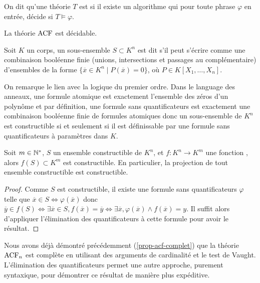 \begin{coro}
    On dit qu'une théorie $T$ est  si il existe un algorithme qui pour
    toute phrase $\varphi$ en entrée, décide si $T \models \varphi$.

    La théorie $\operatorname{ACF}$ est décidable.
\end{coro}

\begin{defi}\label{defi-constructible}
    Soit $K$ un corps, un sous-ensemble $S \subset K^n$ est dit
    s'il peut s'écrire comme une combinaison booléenne finie (unions,
    intersections et passages au complémentaire) d'ensembles de la forme 
    $\{ \overline{x} \in K^n \mid P(\overline{x}) = 0 \}$, où $P \in K[X_1, \dots, X_n]$.
\end{defi}

\begin{rema}
On remarque le lien avec la logique du premier ordre. Dans le language des
anneaux, une formule atomique est exactement l'ensemble des zéros d'un polynôme
et par définition, une formule sans quantificateurs est exactement une
combinaison booléenne finie de formules atomiques donc un sous-ensemble de $K^n$
est constructible si et seulement si il est définissable par une formule sans
quantificateurs à paramètres dans $K$.
\end{rema}

\begin{theo}
Soit $m \in \mathbb{N}^{*}$, $S$ un ensemble constructible de $K^n$, et $f: K^n
\rightarrow K^m$ une fonction , alors $f(S) \subset K^m$ est
constructible.
En particulier, la projection de tout ensemble constructible est constructible.
\end{theo}

\begin{proof}
    Comme $S$ est constructible, il existe une formule sans quantificateurs
    $\varphi$ telle que $\overline{x} \in S \iff \varphi(\overline{x})$ donc $\overline{y}
    \in f(S) \iff \exists \overline{x} \in S, f(\overline{x}) = \overline{y}
    \iff \exists \overline{x}, \varphi(\overline{x}) \wedge f(\overline{x}) =
    y.$ Il suffit alors d'appliquer l'élimination des quantificateurs à cette
    formule pour avoir le résultat.
\end{proof}


Nous avons déjà démontré précédemment  (\cref{prop-acf-complet}) que la théorie
$\operatorname{ACF}_n$ est complète en utilisant des arguments de cardinalité et le test de
Vaught. 
L'élimination des quantificateurs permet une autre approche, purement
syntaxique, 
pour démontrer ce résultat de manière plus expéditive.


